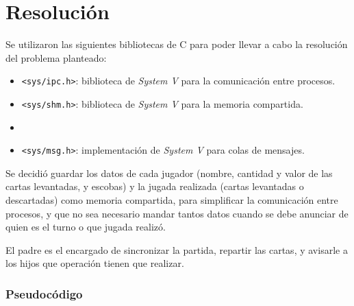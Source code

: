 \section{Resolución}

Se utilizaron las siguientes bibliotecas de C para poder llevar a cabo la resolución del problema planteado:
\begin{itemize}
    \item \texttt{<sys/ipc.h>}: biblioteca de \textit{System V} para la comunicación entre procesos.
    \item \texttt{<sys/shm.h>}: biblioteca de \textit{System V} para la memoria compartida.
    \item \item \texttt{<sys/msg.h>}: implementación de \textit{System V} para colas de mensajes.
\end{itemize}

Se decidió guardar los datos de cada jugador (nombre, cantidad y valor de las cartas levantadas, y escobas) y la jugada realizada (cartas levantadas o descartadas) como memoria compartida, para simplificar la comunicación entre procesos, y que no sea necesario mandar tantos datos cuando se debe anunciar de quien es el turno o que jugada realizó.

El padre es el encargado de sincronizar la partida, repartir las cartas, y avisarle a los hijos que operación tienen que realizar.

\subsubsection{Pseudocódigo}

